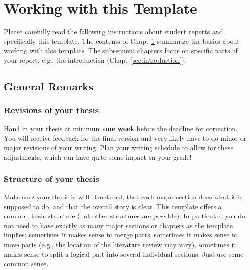 
\chapter{Working with this Template}
\label{sec:Tutorial}

Please carefully read the following instructions about student reports and specifically this template. The contents of Chap.~\ref{sec:Tutorial} summarize the basics about working with this template. The subsequent chapters focus on specific parts of your report, e.g., the introduction (Chap.~\ref{sec:introduction}).

\section{General Remarks}


\subsection{Revisions of your thesis}

Hand in your thesis at minimum \textbf{one week} before the deadline for correction. You will receive feedback for the final version and very likely have to do minor or major revisions of your writing. Plan your writing schedule to allow for these adjustments, which can have quite some impact on your grade! 



\subsection{Structure of your thesis}

Make sure your thesis is well structured, that each major section does what it is supposed to do, and that the overall story is clear. This template offers a common basic structure (but other structures are possible). In particular, you do not need to have exactly as many major sections or chapters as the template implies; sometimes it makes sense to merge parts, sometimes it makes sense to move parts (e.g., the location of the literature review may vary), sometimes it makes sense to split a logical part into several individual sections. Just use some common sense. 

